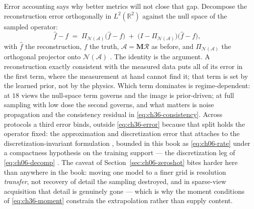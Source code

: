 Error accounting says why better metrics will not close that gap. Decompose the
reconstruction error orthogonally in $L^2(\mathbb{R}^2)$ against the null space of
the sampled operator:
\begin{equation}
  \label{eq:ch36-error}
  \hat f - f \;=\; \Pi_{\mathcal{N}(\mathcal{A})}\big(\hat f - f\big) \;+\; \big(I - \Pi_{\mathcal{N}(\mathcal{A})}\big)\big(\hat f - f\big),
\end{equation}
with $\hat f$ the reconstruction, $f$ the truth, $\mathcal{A}=\mathbf{M}\mathcal{R}$
as before, and $\Pi_{\mathcal{N}(\mathcal{A})}$ the orthogonal projector onto
$\mathcal{N}(\mathcal{A})$ . The identity
is the argument. A reconstruction exactly consistent with the measured data puts
all of its error in the first term, where the measurement at hand cannot find
it; that term is set by the learned prior, not by the physics.
Which term dominates is regime-dependent: at $18$ views the null-space term
governs and the image is prior-driven; at full sampling with low dose the second
governs, and what matters is noise propagation and the consistency residual in
\eqref{eq:ch36-consistency}. Across protocols a third error binds, outside
\eqref{eq:ch36-error} because that split holds the operator fixed: the
approximation and discretization error that attaches to the discretization-invariant
formulation \cite{kovachki2023neural}, bounded in this book as \eqref{eq:ch06-rate}
under a compactness hypothesis on the training support --- the discretization leg
of \eqref{eq:ch06-decomp} \cite{subedi2024controlling}. The
caveat of
Section~\ref{sec:ch06-zeroshot} bites harder here than anywhere in the book:
moving one model to a finer grid is resolution \emph{transfer}, not recovery of
detail the sampling destroyed, and in sparse-view acquisition that detail is
genuinely gone --- which is why the moment conditions of
\eqref{eq:ch36-moment} constrain the extrapolation rather than supply content.


